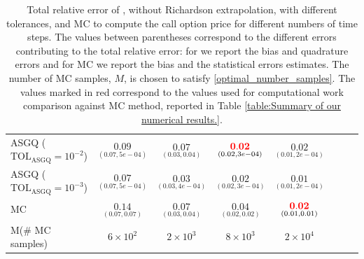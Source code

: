 \begin{table}[h!]
\begin{tabular}{l*{6}{c}r}
		ASGQ ($\text{TOL}_{\text{ASGQ}}=10^{-2}$)  &  $\underset{(0.07,5e-04)}{\mathbf{0.09}}$& $\underset{(0.03,0.04)}{\mathbf{0.07}}$& $\underset{(0.02,3e-04)}{\mathbf{ {\color{red}0.02}}}$ & $\underset{(0.01,2e-04)}{\mathbf{ 0.02}}$  \\
		ASGQ ($\text{TOL}_{\text{ASGQ}}=10^{-3}$)  &  $\underset{(0.07,5e-04)}{\mathbf{0.07}}$& $\underset{(0.03,4e-04)}{\mathbf{0.03}}$& $\underset{(0.02,3e-04)}{\mathbf{0.02}}$  & $\underset{(0.01,2e-04)}{\mathbf{ 0.01}}$  \\
%
			\hline
		MC    & $\underset{(0.07,0.07)}{\mathbf{0.14}}$  & $\underset{(0.03,0.04)}{\mathbf{0.07}}$  & $\underset{(0.02,0.02)}{\mathbf{0.04}}$ & $\underset{(0.01,0.01)}{\mathbf{{\color{red}0.02}}}$  \\		
			M(\# MC samples)   & $6 \times 10^2$  & $2 \times 10^3$  & $8 \times 10^3$ & $2 \times 10^4$  \\		
		\bottomrule[1.25pt]
	\end{tabular}
	\caption{Total relative error of , without Richardson extrapolation, with  different tolerances,  and MC to compute the call option price  for different numbers of time steps. The values between parentheses correspond to the different errors contributing to the total relative error: for  we report the bias and quadrature errors and for MC we report the bias and the statistical errors estimates. The number of MC samples, $M$, is chosen to satisfy \eqref{optimal_number_samples}. The values marked in red correspond to the values used for computational work comparison against MC method, reported in Table \ref{table:Summary of our numerical results.}.}
	\label{Total error of MISC and MC to compute Call option price of the different tolerances for different number of time steps. Case set 5, without Richardson extrapolation. The numbers between parentheses are the corresponding absolute errors.}
\end{table}

